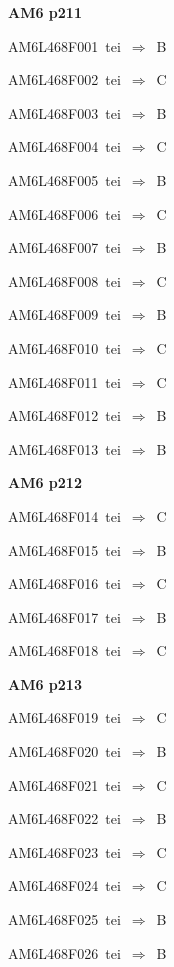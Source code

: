 \par\vfill\eject
{\bf\hfill AM6 p211\hfill\hbox{}}\par\bigskip
{\sixrm AM6L468F001\ {\sixit tei}\ }$\Rightarrow$\ B\par\smallskip
{\sixrm AM6L468F002\ {\sixit tei}\ }$\Rightarrow$\ C\par\smallskip
{\sixrm AM6L468F003\ {\sixit tei}\ }$\Rightarrow$\ B\par\smallskip
{\sixrm AM6L468F004\ {\sixit tei}\ }$\Rightarrow$\ C\par\smallskip
{\sixrm AM6L468F005\ {\sixit tei}\ }$\Rightarrow$\ B\par\smallskip
{\sixrm AM6L468F006\ {\sixit tei}\ }$\Rightarrow$\ C\par\smallskip
{\sixrm AM6L468F007\ {\sixit tei}\ }$\Rightarrow$\ B\par\smallskip
{\sixrm AM6L468F008\ {\sixit tei}\ }$\Rightarrow$\ C\par\smallskip
{\sixrm AM6L468F009\ {\sixit tei}\ }$\Rightarrow$\ B\par\smallskip
{\sixrm AM6L468F010\ {\sixit tei}\ }$\Rightarrow$\ C\par\smallskip
{\sixrm AM6L468F011\ {\sixit tei}\ }$\Rightarrow$\ C\par\smallskip
{\sixrm AM6L468F012\ {\sixit tei}\ }$\Rightarrow$\ B\par\smallskip
{\sixrm AM6L468F013\ {\sixit tei}\ }$\Rightarrow$\ B\par\smallskip

\par\vfill\eject
{\bf\hfill AM6 p212\hfill\hbox{}}\par\bigskip
{\sixrm AM6L468F014\ {\sixit tei}\ }$\Rightarrow$\ C\par\smallskip
{\sixrm AM6L468F015\ {\sixit tei}\ }$\Rightarrow$\ B\par\smallskip
{\sixrm AM6L468F016\ {\sixit tei}\ }$\Rightarrow$\ C\par\smallskip
{\sixrm AM6L468F017\ {\sixit tei}\ }$\Rightarrow$\ {\tenit B}\par\smallskip
{\sixrm AM6L468F018\ {\sixit tei}\ }$\Rightarrow$\ {\tenit C}\par\smallskip

\par\vfill\eject
{\bf\hfill AM6 p213\hfill\hbox{}}\par\bigskip
{\sixrm AM6L468F019\ {\sixit tei}\ }$\Rightarrow$\ C\par\smallskip
{\sixrm AM6L468F020\ {\sixit tei}\ }$\Rightarrow$\ B\par\smallskip
{\sixrm AM6L468F021\ {\sixit tei}\ }$\Rightarrow$\ C\par\smallskip
{\sixrm AM6L468F022\ {\sixit tei}\ }$\Rightarrow$\ B\par\smallskip
{\sixrm AM6L468F023\ {\sixit tei}\ }$\Rightarrow$\ C\par\smallskip
{\sixrm AM6L468F024\ {\sixit tei}\ }$\Rightarrow$\ C\par\smallskip
{\sixrm AM6L468F025\ {\sixit tei}\ }$\Rightarrow$\ B\par\smallskip
{\sixrm AM6L468F026\ {\sixit tei}\ }$\Rightarrow$\ B\par\smallskip

